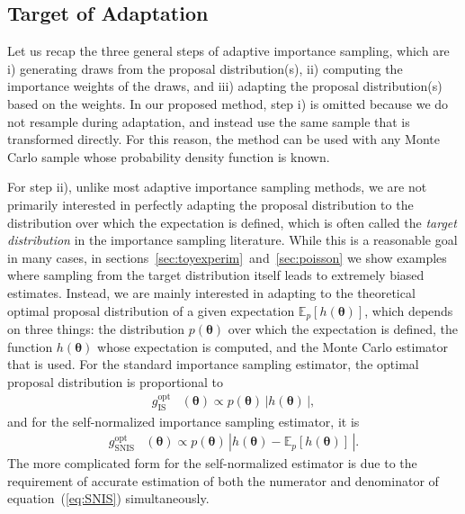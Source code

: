 \documentclass[12pt]{article}
\newenvironment{nalign}{
    \begin{equation}
    \begin{aligned}
}{
    \end{aligned}
    \end{equation}
    \ignorespacesafterend
}
\begin{document}
\subsection{Target of Adaptation} \label{sec:target}



Let us recap the three general steps of adaptive importance sampling, which are
i) generating draws from the proposal distribution(s),
ii) computing the importance weights of the draws, and iii) adapting the proposal distribution(s)
based on the weights.
In our proposed method, step i) is omitted because we do not resample
during adaptation, and instead use the same sample that is transformed directly.
For this reason, the method can be used with any Monte Carlo sample whose
probability density function is known.
%
%




%
%


%
%
%
%
%
%
%
%

For step ii),
unlike most adaptive importance sampling methods, we are not primarily interested in
perfectly adapting the proposal distribution to the distribution over which the expectation is defined, which
is often called the \emph{target distribution} in the importance sampling literature.
%
%
%
%
%
%
%
%
%
%
While this is a reasonable goal in many cases, in sections~\ref{sec:toyexperim}~and~\ref{sec:poisson} we show examples
where sampling from the target distribution itself
leads to extremely biased estimates.
Instead, we are mainly interested in adapting to the theoretical optimal proposal distribution
of a given expectation $\mathbb{E}_p [h(\boldsymbol{\theta})]$, which
depends on three things: the distribution $p (\boldsymbol{\theta})$ over which the expectation is defined, the function $h (\boldsymbol{\theta})$ whose
expectation is computed, and the Monte Carlo estimator that is used.
%
%
%
%
%
For the standard importance sampling estimator,
%
the optimal proposal distribution is proportional to~\citep{kahn1953methods}
\begin{nalign} \label{eq:isopt}
g_{\text{IS}}^{\text{opt}} & (\boldsymbol{\theta})  \propto p (\boldsymbol{\theta}) \, |h(\boldsymbol{\theta}) \, | ,
\end{nalign}
and for the self-normalized importance sampling estimator, it is~\citep{hesterberg1988advances}
\begin{nalign} \label{eq:snisopt}
g_{\text{SNIS}}^{\text{opt}} & (\boldsymbol{\theta})  \propto p (\boldsymbol{\theta}) \, |h(\boldsymbol{\theta}) - \mathbb{E}_p [h(\boldsymbol{\theta})]\, | .
\end{nalign}
The more complicated form for the self-normalized estimator is due to the requirement of
accurate estimation of both the numerator and denominator of equation~(\ref{eq:SNIS}) simultaneously.
\end{document}
